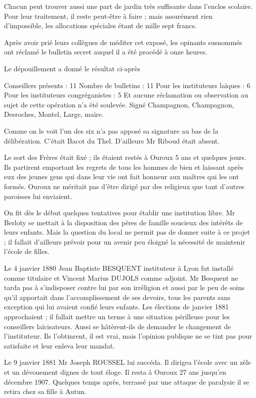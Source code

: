 Chacun peut trouver aussi une part de jardin très suffisante dans l'enclos scolaire. Pour leur traitement, il reste peut-être à faire ; mais assurément rien d'impossible, les allocations spéciales étant de mille sept francs.

Après avoir prié leurs collègues de méditer cet exposé, les opinants susnommés ont réclamé le bulletin secret auquel il a été procédé à onze heures.

Le dépouillement a donné le résultat ci-après

Conseillers présents : 11  
Nombre de bulletins : 11  
Pour les instituteurs laïques : 6  
Pour les instituteurs congréganistes : 5  
Et aucune réclamation ou observation au sujet de cette opération n'a été soulevée. Signé Champagnon, Champagnon, Desroches, Montel, Large, maire.

Comme on le voit l'un des six n'a pas apposé sa signature au bas de la délibération. C'était Bacot du Thel. D'ailleurs Mr Riboud était absent.

Le sort des Frères était fixé ; ils étaient restés à Ouroux 5 ans et quelques jours. Ils partirent emportant les regrets de tous les hommes de bien et laissant après eux des jeunes gens qui dans leur vie ont fait honneur aux maîtres qui les ont formés. Ouroux ne méritait pas d'être dirigé par des religieux que tant d'autres paroisses lui enviaient.

On fit dès le début quelques tentatives pour établir une institution libre. Mr Berloty se mettait à la disposition des pères de famille soucieux des intérêts de leurs enfants. Mais la question du local ne permit pas de donner suite à ce projet ; il fallait d'ailleurs prévoir pour un avenir peu éloigné la nécessité de maintenir l'école de filles.

Le 4 janvier 1880 Jean Baptiste BESQUENT instituteur à Lyon fut installé comme titulaire et Vincent Marius DUJOLS comme adjoint. Mr Besquent ne tarda pas à s'indisposer contre lui par son irréligion et
aussi par le peu de soins qu'il apportait dans l'accomplissement de ses devoirs, tous les parents sans exception qui lui avaient confié leurs enfants. Les élections de janvier 1881 approchaient ; il fallait mettre un terme à une situation périlleuse pour les conseillers laïcisateurs. Aussi se hâtèrent-ils de demander le changement de l'instituteur. Ils l'obtinrent, il est vrai, mais l'opinion publique ne se tint pas pour satisfaite et leur enleva leur mandat.

Le 9 janvier 1881 Mr Joseph ROUSSEL lui succéda. Il dirigea l'école avec un zèle et un dévouement dignes de tout éloge. Il resta à Ouroux 27 ans jusqu'en décembre 1907. Quelques temps après, terrassé par une attaque de paralysie il se retira chez sa fille à Autun.

